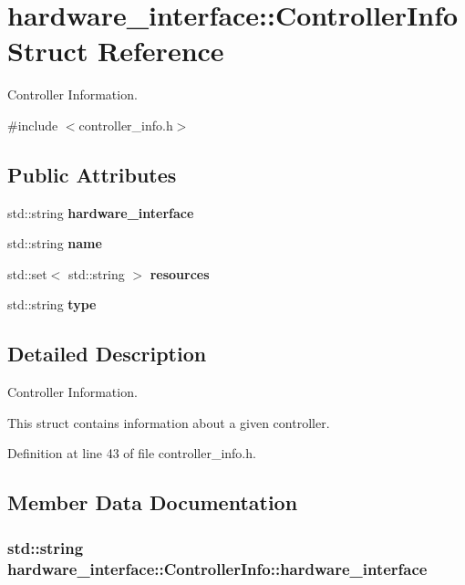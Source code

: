 \section{hardware\-\_\-interface\-:\-:\-Controller\-Info \-Struct \-Reference}
\label{structhardware__interface_1_1ControllerInfo}


\-Controller \-Information.  




{\ttfamily \#include $<$controller\-\_\-info.\-h$>$}

\subsection*{\-Public \-Attributes}
\begin{DoxyCompactItemize}
\item 
std\-::string {\bf hardware\-\_\-interface}
\item 
std\-::string {\bf name}
\item 
std\-::set$<$ std\-::string $>$ {\bf resources}
\item 
std\-::string {\bf type}
\end{DoxyCompactItemize}


\subsection{\-Detailed \-Description}
\-Controller \-Information. 

\-This struct contains information about a given controller. 

\-Definition at line 43 of file controller\-\_\-info.\-h.



\subsection{\-Member \-Data \-Documentation}
\subsubsection[{hardware\-\_\-interface}]{\setlength{\rightskip}{0pt plus 5cm}std\-::string {\bf hardware\-\_\-interface\-::\-Controller\-Info\-::hardware\-\_\-interface}}\label{structhardware__interface_1_1ControllerInfo_a271751e411f47c0118c4fc4ca5da05c0}


